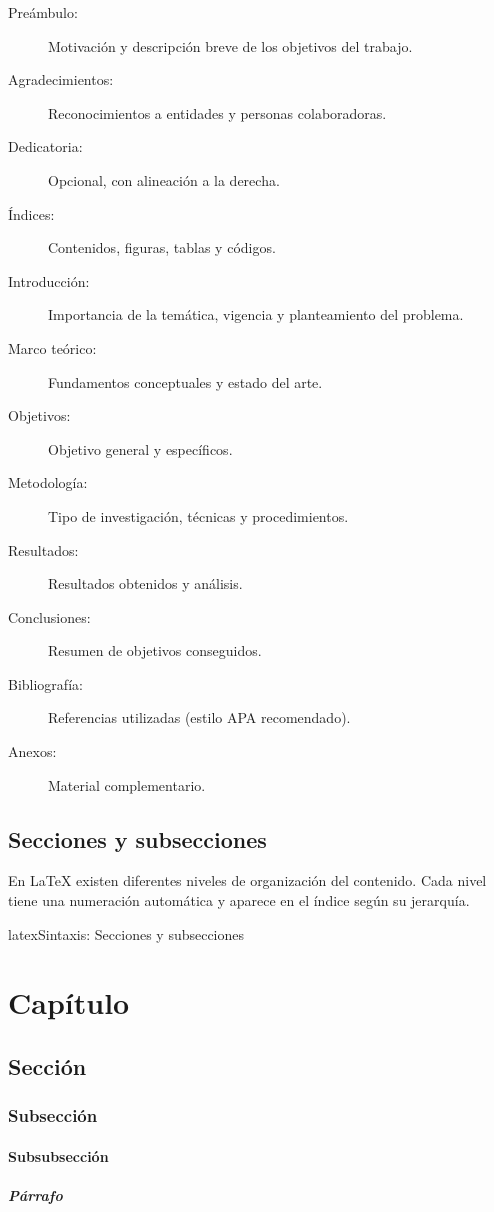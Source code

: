 \begin{description}
  \item[Preámbulo:] Motivación y descripción breve de los objetivos del trabajo.
  \item[Agradecimientos:] Reconocimientos a entidades y personas colaboradoras.
  \item[Dedicatoria:] Opcional, con alineación a la derecha.
  \item[Índices:] Contenidos, figuras, tablas y códigos.
  \item[Introducción:] Importancia de la temática, vigencia y planteamiento del problema.
  \item[Marco teórico:] Fundamentos conceptuales y estado del arte.
  \item[Objetivos:] Objetivo general y específicos.
  \item[Metodología:] Tipo de investigación, técnicas y procedimientos.
  \item[Resultados:] Resultados obtenidos y análisis.
  \item[Conclusiones:] Resumen de objetivos conseguidos.
  \item[Bibliografía:] Referencias utilizadas (estilo APA recomendado).
  \item[Anexos:] Material complementario.
\end{description}

\section{Secciones y subsecciones}
\label{sec:secciones}

En \LaTeX{} existen diferentes niveles de organización del contenido.
Cada nivel tiene una numeración automática y aparece en el índice según
su jerarquía.

\begin{codigosimple}{latex}{Sintaxis: Secciones y subsecciones}
\chapter{Capítulo}           %
\section{Sección}            %
\subsection{Subsección}      %
\subsubsection{Subsubsección}%
\paragraph{Párrafo}          %
\end{codigosimple}

